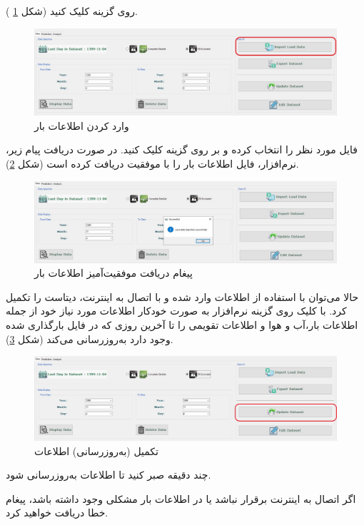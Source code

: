 \documentclass[a4paper,20pt,dvipsnames, usenames]{extbook}
\begin{document}
روی گزینه
کلیک کنید (شکل
\ref{fig15}
).
\begin{figure}[h]
	\centering
	\includegraphics[width = \textwidth]{fig2}
	\caption{وارد کردن اطلاعات بار}
	\label{fig15}
\end{figure}
فایل مورد نظر را انتخاب کرده و بر روی گزینه
کلیک کنید.
در صورت دریافت پیام زیر، نرم‌افزار، فایل اطلاعات بار را با موفقیت دریافت کرده است (شکل
\ref{fig17}).
\begin{figure}[h]
	\centering
	\includegraphics[width = \textwidth]{fig4}
	\caption{پیغام دریافت موفقیت‌آمیز اطلاعات بار}
	\label{fig17}
\end{figure}

حالا می‌توان با استفاده از اطلاعات وارد شده و با اتصال به اینترنت، دیتاست را تکمیل کرد. با کلیک روی گزینه
نرم‌افزار به صورت خودکار اطلاعات مورد نیاز خود از جمله اطلاعات بار،‌آب و هوا و اطلاعات تقویمی را تا آخرین روزی که در فایل بارگذاری شده وجود دارد به‌روزرسانی می‌کند (شکل
\ref{fig18}).
\begin{figure}[!h]
	\centering
	\includegraphics[width = \textwidth]{fig5}
	\caption{تکمیل (به‌روزرسانی) اطلاعات}
	\label{fig18}
\end{figure}

چند دقیقه صبر کنید تا اطلاعات به‌روزرسانی شود.

اگر اتصال به اینترنت برقرار نباشد یا در اطلاعات بار مشکلی وجود داشته باشد، پیغام خطا دریافت خواهید کرد.
\end{document}
